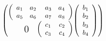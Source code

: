 \documentclass[12pt]{article}
\begin{document}
${ \displaystyle
   \left(
     \begin{array}{@{}r@{}l@{}}
       \left(
         \begin{array}{llrr}
           a_1 & a_2 \thickspace & a_3 & a_4 \\
           a_5 & a_6 \thickspace & a_7 & a_8 \\
         \end{array}
       \right)
     &
       \multirow{2}{*}[1.4ex]
       {$
         \left(
           \begin{array}{c}
             b_1 \\
             b_2 \\ [0.3ex]
             b_3 \\
             b_4 \\
           \end{array}
         \right)
       $}
     \\ [1.7ex]
       \begin{array}{lr@{}}
         $\raisebox{-0.5ex}{\Large 0}$\thinspace
         &
         \left(
           \begin{array}{rr}
             c_1 \thinspace & c_2 \\
             c_3 \thinspace & c_4 \\
           \end{array}
         \right)
       \end{array}
     &
     \end{array}
   \right)
}$
\end{document}
